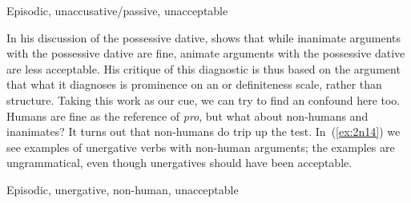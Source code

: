 \begin{exe}
\begin{xlist}
\begin{exe}
\begin{xlist}
\begin{exe}
\begin{xlist}
\begin{exe}
\begin{exe}
\begin{xlist}
\begin{exe}
\begin{xlist}
\begin{exe}
\begin{xlist}
\begin{exe}
\begin{xlist}
\begin{exe}
\begin{xlist}
\begin{exe}
\begin{xlist}
\begin{exe}
\begin{xlist}
\begin{exe}
\begin{xlist}
 \z

 \ex  Episodic, unaccusative/passive, unacceptable \label{ex:2n13}
 \begin{xlist} 
	
	
 \z
\z 
		
In his discussion of the possessive dative, \cite{gafter14li} shows that while inanimate arguments with the possessive dative are fine, animate arguments with the possessive dative are less acceptable. His critique of this diagnostic is thus based on the argument that what it diagnoses is prominence on an  or definiteness scale, rather than structure. Taking this work as our cue, we can try to find an  confound here too. Humans are fine as the reference of \emph{pro}, but what about non-humans and inanimates? It turns out that non-humans do trip up the test. In~(\ref{ex:2n14}) we see examples of unergative verbs with non-human arguments; the examples are ungrammatical, even though unergatives should have been acceptable.

 \begin{exe}
 \ex  Episodic, unergative, non-human, unacceptable \label{ex:2n14}
 \begin{xlist} 
		

		
		


\end{xlist}
\end{exe}
\end{xlist}
\end{xlist}
\end{exe}
\end{xlist}
\end{exe}
\end{xlist}
\end{exe}
\end{xlist}
\end{exe}
\end{xlist}
\end{exe}
\end{xlist}
\end{exe}
\end{xlist}
\end{exe}
\end{xlist}
\end{exe}
\end{exe}
\end{xlist}
\end{exe}
\end{xlist}
\end{exe}
\end{xlist}
\end{exe}
